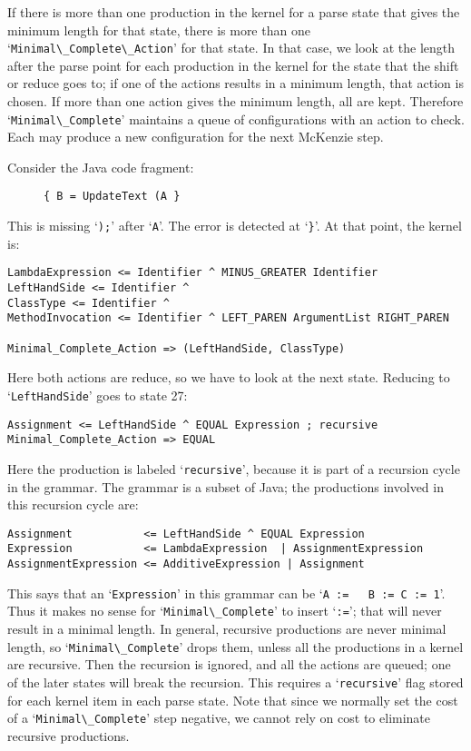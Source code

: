 \documentclass{article}
\newcommand{\code}[1]{`\lstinline|#1|'}
\begin{document}
If there is more than one production in the kernel for a parse state
that gives the minimum length for that state, there is more than one
\code{Minimal\_Complete\_Action} for that state. In that case, we look
at the length after the parse point for each production in the kernel
for the state that the shift or reduce goes to; if one of the actions
results in a minimum length, that action is chosen. If more than one
action gives the minimum length, all are kept. Therefore
\code{Minimal\_Complete} maintains a queue of configurations with an
action to check. Each may produce a new configuration for the next
McKenzie step.

Consider the Java code fragment:
\begin{figure}[H]
\begin{lstlisting}
{ B = UpdateText (A }
\end{lstlisting}
\caption{}
\label{ex:recursive_length_after_dot}
\end{figure}
This is missing \code{);} after \code{A}. The error is detected at
`\lstinline|}|'. At that point, the kernel is:
\begin{verbatim}
LambdaExpression <= Identifier ^ MINUS_GREATER Identifier
LeftHandSide <= Identifier ^
ClassType <= Identifier ^
MethodInvocation <= Identifier ^ LEFT_PAREN ArgumentList RIGHT_PAREN

Minimal_Complete_Action => (LeftHandSide, ClassType)
\end{verbatim}
Here both actions are reduce, so we have to look at the next state.
Reducing to \code{LeftHandSide} goes to state 27:
\begin{verbatim}
Assignment <= LeftHandSide ^ EQUAL Expression ; recursive
Minimal_Complete_Action => EQUAL
\end{verbatim}
Here the production is labeled \code{recursive}, because it is part of
a recursion cycle in the grammar. The grammar is a subset of Java; the
productions involved in this recursion cycle are:
\begin{verbatim}
Assignment           <= LeftHandSide ^ EQUAL Expression
Expression           <= LambdaExpression  | AssignmentExpression
AssignmentExpression <= AdditiveExpression | Assignment
\end{verbatim}
This says that an \code{Expression} in this grammar can be \code{A :=
  B := C := 1}. Thus it makes no sense for \code{Minimal\_Complete} to
insert \code{:=}; that will never result in a minimal length. In
general, recursive productions are never minimal length, so
\code{Minimal\_Complete} drops them, unless all the productions in a
kernel are recursive. Then the recursion is ignored, and all the
actions are queued; one of the later states will break the recursion.
This requires a \code{recursive} flag stored for each kernel item in
each parse state. Note that since we normally set the cost of a
\code{Minimal\_Complete} step negative, we cannot rely on cost to
eliminate recursive productions.
\end{document}
